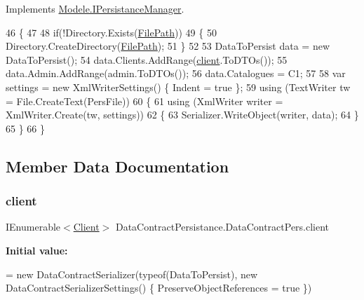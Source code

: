Implements \hyperlink{interfaceModele_1_1IPersistanceManager_a1b1fcf75cf99ef247ad7f83b1e816ea4}{Modele.\+I\+Persistance\+Manager}.


\begin{DoxyCode}
46         \{
47             
48             \textcolor{keywordflow}{if}(!Directory.Exists(\hyperlink{classDataContractPersistance_1_1DataContractPers_ad82c0f6387b133099f996fe0f05e24ce}{FilePath}))
49             \{
50                 Directory.CreateDirectory(\hyperlink{classDataContractPersistance_1_1DataContractPers_ad82c0f6387b133099f996fe0f05e24ce}{FilePath});
51             \}
52 
53             DataToPersist data = \textcolor{keyword}{new} DataToPersist();
54             data.Clients.AddRange(\hyperlink{classDataContractPersistance_1_1DataContractPers_a397297f0e263edc3771ed782292666ae}{client}.ToDTOs());
55             data.Admin.AddRange(admin.ToDTOs());
56             data.Catalogues = C1;
57 
58             var settings = \textcolor{keyword}{new} XmlWriterSettings() \{ Indent = \textcolor{keyword}{true} \};
59             \textcolor{keyword}{using} (TextWriter tw = File.CreateText(PersFile))
60             \{
61                 \textcolor{keyword}{using} (XmlWriter writer = XmlWriter.Create(tw, settings))
62                 \{
63                     Serializer.WriteObject(writer, data);
64                 \}
65             \}
66         \}
\end{DoxyCode}


\subsection{Member Data Documentation}
\mbox{\label{classDataContractPersistance_1_1DataContractPers_a397297f0e263edc3771ed782292666ae}} 
\subsubsection{\texorpdfstring{client}{client}}
{\footnotesize\ttfamily I\+Enumerable$<$\hyperlink{classModele_1_1Client}{Client}$>$ Data\+Contract\+Persistance.\+Data\+Contract\+Pers.\+client}

{\bfseries Initial value\+:}
\begin{DoxyCode}
= \textcolor{keyword}{new} DataContractSerializer(typeof(DataToPersist),
                                                    \textcolor{keyword}{new} DataContractSerializerSettings()
                                                    \{
                                                        PreserveObjectReferences = \textcolor{keyword}{true}
                                                    \})
\end{DoxyCode}


